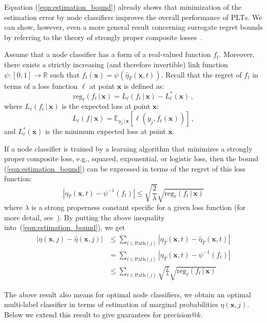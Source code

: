 \documentclass{article}
\newcommand{\Algo}[1]{\textsc{#1}}
\renewcommand{\vec}[1]{\boldsymbol{#1}}
\newcommand{\bx}{\vec{x}}
\newcommand{\heta}{\hat{\eta}}
\newcommand{\Path}[1]{\mathrm{Path}(#1)}
\newcommand{\reg}{\mathrm{reg}}
\newcommand{\given}{\, | \,}
\begin{document}
Equation (\ref{eqn:estimation_bound}) already shows that minimization of the estimation error by node classifiers improves the overall performance of \Algo{PLT}s. We can show, however, even a more general result concerning surrogate regret bounds by referring to the theory of  strongly proper composite losses~\cite{Agarwal_2014}. 

Assume that a node classifier has a form of a real-valued function $f_t$. Moreover, there exists a strictly increasing (and therefore invertible) link function $\psi: [0,1] \rightarrow \mathbb{R}$ such that $f_t(\bx) = \psi(\heta_T(\bx,t))$. Recall that the regret of $f_t$ in terms of a loss function $\ell$ at point $\bx$ is defined as:
$$
\reg_{\ell}(f_t \given \bx) = L_{\ell}(f_t \given \bx) - L_{\ell}^*(\bx) \,,
$$
where $L_{\ell}(f_t \given \bx)$ is the expected loss  at  point $\bx$:
$$
L_{\ell}(f \given \bx) = \mathbb{E}_{y_j\given\bx} \left [ \ell  (y_j, f_t(\bx)) \right ] \,,
$$
and  $L_{\ell}^*(\bx)$ is the minimum expected loss at point $\bx$.

If a node classifier is trained by a learning algorithm that minimizes a strongly proper composite loss, e.g.,  squared, exponential, or logistic loss, then the bound (\ref{eqn:estimation_bound}) can be expressed in terms of the regret of this loss function: 
$$
\left | \eta_T(\bx, t) - \psi^{-1}(f_t)  \right | \le \sqrt{ \frac{2}{\lambda}} \sqrt{\reg_\ell(f_t \given \bx)}
$$
where $\lambda$ is a strong properness constant specific for a given loss function (for more detail, see~\cite{Agarwal_2014}). By putting the above inequality into~(\ref{eqn:estimation_bound}), we get
\begin{align*}
\left | \eta(\bx, j) - \heta(\bx, j) \right | 
& 
\le \! \sum_{t \in \Path{j}} \! \left | \eta_T(\bx, t) - \heta_T(\bx, t) \right | \\ 
& 
= \!  \sum_{t \in \Path{j}}  \! \left | \eta_T(\bx, t) - \psi^{-1}(f_t)  \right | \\ 
&
\le  \! \sum_{t \in \Path{j}}  \! \sqrt{ \frac{2}{\lambda}} \sqrt{\reg_\ell(f_t \given \bx)}
\end{align*} 

The above result also means for optimal node classifiers, we obtain an optimal multi-label classifier in terms of estimation of marginal probabilities $\eta(\bx,j)$. Below we extend this result to give guarantees for precision@$k$. 
\end{document}
